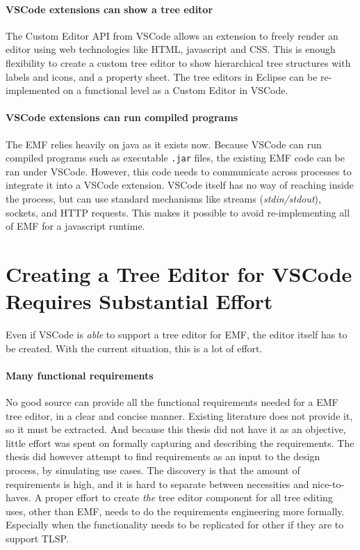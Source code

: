 \paragraph{VSCode extensions can show a tree editor}
The Custom Editor \acrshort{API} from \gls{VSCode} allows an extension to freely render an editor using web technologies like HTML, javascript and CSS.
This is enough flexibility to create a custom tree editor to show hierarchical tree structures with labels and icons, and a property sheet.
The tree editors in \gls{Eclipse} can be re-implemented on a functional level as a Custom Editor in \gls{VSCode}.

\paragraph{VSCode extensions can run compiled programs}
The \acrlong{EMF} relies heavily on java as it exists now.
Because \gls{VSCode} can run compiled programs such as executable \texttt{.jar} files, the existing \acrshort{EMF} code can be ran under \gls{VSCode}.
However, this code needs to communicate across processes to integrate it into a \gls{VSCode} extension.
\gls{VSCode} itself has no way of reaching inside the process, but can use standard mechanisms like streams (\textit{stdin/stdout}), sockets, and HTTP requests.
This makes it possible to avoid re-implementing all of \acrshort{EMF} for a javascript runtime.


\section{Creating a Tree Editor for VSCode Requires Substantial Effort}

Even if \gls{VSCode} is \textit{able} to support a tree editor for \acrshort{EMF}, the editor itself has to be created.
With the current situation, this is a lot of effort.

\paragraph{Many functional requirements}
No good source can provide all the functional requirements needed for a \acrshort{EMF} tree editor, in a clear and concise manner.
Existing literature does not provide it, so it must be extracted.
And because this thesis did not have it as an objective, little effort was spent on formally capturing and describing the requirements.
The thesis did however attempt to find requirements as an input to the design process, by simulating use cases.
The discovery is that the amount of requirements is high, and it is hard to separate between necessities and nice-to-haves.
A proper effort to create \textit{the} tree editor component for all tree editing uses, other than \acrshort{EMF}, needs to do the requirements engineering more formally.
Especially when the functionality needs to be replicated for other  if they are to support \acrshort{TLSP}.

